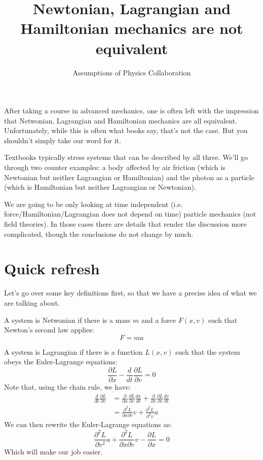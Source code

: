 \documentclass[11pt]{article}
\begin{document}
	
	
	\title{Newtonian, Lagrangian and Hamiltonian mechanics are not equivalent}
	\author{Assumptions of Physics Collaboration}
	
	\date{}
	
	\maketitle
	
After taking a course in advanced mechanics, one is often left with the impression that Netwonian, Lagrangian and Hamiltonian mechanics are all equivalent. Unfortunately, while this is often what books say, that's not the case. But you shouldn't simply take our word for it.

Textbooks typically stress systems that can be described by all three. We'll go through two counter examples: a body affected by air friction (which is Newtonian but neither Lagrangian or Hamiltonian) and the photon as a particle (which is Hamiltonian but neither Lagrangian or Newtonian). 

We are going to be only looking at time independent (i.e. force/Hamiltonian/Lagrangian does not depend on time) particle mechanics (not field theories). In those cases there are details that render the discussion more complicated, though the conclusions do not change by much.

\section{Quick refresh}

Let's go over some key definitions first, so that we have a precise idea of what we are talking about.

A system is Netwonian if there is a mass $m$ and a force $F(x,v)$ such that Newton's second law applies:
\begin{equation}
\label{Fma}
F=ma
\end{equation}

A system is Lagrangian if there is a function $L(x,v)$ such that the system obeys the Euler-Lagrange equations:
\begin{equation}
\label{EulerLagrange}
\frac{\partial L}{\partial x} - \frac{d}{dt} \frac{\partial L}{\partial v} = 0
\end{equation}
Note that, using the chain rule, we have:
\begin{align*}
\frac{d}{dt} \frac{\partial L}{\partial v} &= \frac{\partial}{\partial x} \frac{\partial L}{\partial v} \frac{dx}{dt} + \frac{\partial}{\partial v}  \frac{\partial L}{\partial v} \frac{dv}{dt} \\
&= \frac{\partial^2 L}{\partial x \partial v} v + \frac{\partial^2 L}{\partial^2 v} a
\end{align*}
We can then rewrite the Euler-Lagrange equations as:
\begin{equation}
\label{EulerLagrangeMod}
\frac{\partial^2 L}{\partial v^2} a + \frac{\partial^2 L}{\partial x \partial v} v - \frac{\partial L}{\partial x}=0
\end{equation}
Which will make our job easier.
\end{document}
